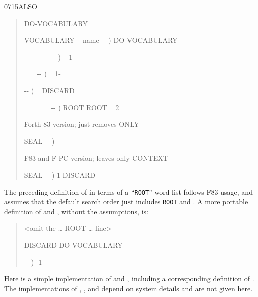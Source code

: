 \begin{worddef}{0715}{ALSO}
\begin{rationale}
\begin{quote}
		 
		 \word{,} DO-VOCABULARY

		\word{:} VOCABULARY ~ name -{}- )
			  \word{,} DO-VOCABULARY
		\word{;}

		\word{:}  ~~~~~~~ -{}- )
			 ~ 
			 1+ 
		\word{;}

		\word{:}  ~~~ -{}- )
			 ~ 
			 1- 
		\word{;}

		\word{:}   -{}- )
			 ~ 
			 DISCARD
		\word{;}

		\word{:}  ~~~~~~~ -{}- )
			ROOT ROOT ~ 2 
		\word{;}

		 Forth-83 version; just removes ONLY

		\word{:} SEAL  -{}- )
			 
			 
		\word{;}

		 F83 and F-PC version; leaves only CONTEXT

		\word{:} SEAL  -{}- )
			 
			1  DISCARD
		\word{;}
		\end{quote}

		The preceding definition of  in terms of a
		``\texttt{ROOT}'' word list follows F83 usage, and assumes
		that the default search order just includes \texttt{ROOT} and
		. A more portable definition of  and
		, without the assumptions, is:
		\begin{quote}\ttfamily
		<omit the {\ldots}
			  ROOT
		{\ldots} line>

		  
			 \word[core]{,} DISCARD DO-VOCABULARY

		\word[core]{:}   -{}- )
			-1 
		\word[core]{;}
		\end{quote}

		Here is a simple implementation of  and
		, including a corresponding definition of
		. The implementations of ,
		,  and
		 depend on system details and are not given
		here.


\end{rationale}
\end{worddef}
